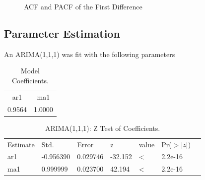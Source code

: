 \documentclass[12pt, centerh1]{article}
\begin{document}
\begin{figure}[H]%
    \centering
    \qquad
    \caption{ACF and PACF of the First Difference}%
    \label{fig:acf&pacf_diff}%
\end{figure}

\subsection{Parameter Estimation} 

An ARIMA(1,1,1) was fit with the following parameters

\begin{table}[H]
\centering
\begin{tabular}{cc}
ar1     & ma1   \\
 0.9564  & 1.0000      
\end{tabular}
\caption{Model Coefficients.}
\label{table:coefficients}
\end{table}

\begin{table}[H]
\centering
\begin{tabular}{lllllll}
Estimate & Std.      & Error    & z       & value       & Pr($>|z|$) &     \\
ar1      & -0.956390 & 0.029746 & -32.152 & \textless{} & 2.2e-16 \\
ma1      & 0.999999  & 0.023700 & 42.194  & \textless{} & 2.2e-16
\end{tabular}
\caption{ARIMA(1,1,1): Z Test of Coefficients.}
\label{table:1}
\end{table}
\end{document}
